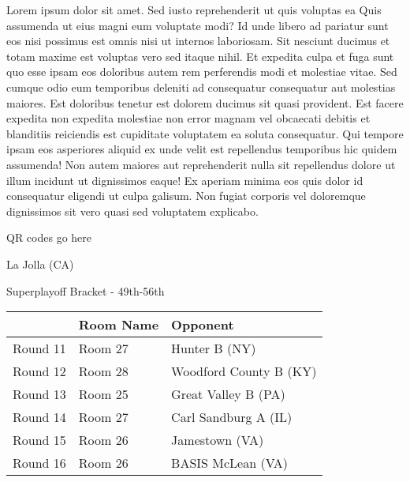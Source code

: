 \documentclass{article}%
\begin{document}
\vspace*{8pt}%
\linebreak%
\newline%
\newline%
    Lorem ipsum dolor sit amet. Sed iusto reprehenderit ut quis voluptas ea Quis assumenda ut eius magni eum voluptate modi? Id unde libero ad pariatur sunt eos nisi possimus est omnis nisi ut internos laboriosam. Sit nesciunt ducimus et totam maxime est voluptas vero sed itaque nihil. Et expedita culpa et fuga sunt quo esse ipsam eos doloribus autem rem perferendis modi et molestiae vitae.\newline%
\newline%
    Sed cumque odio eum temporibus deleniti ad consequatur consequatur aut molestias maiores. Est doloribus tenetur est dolorem ducimus sit quasi provident. Est facere expedita non expedita molestiae non error magnam vel obcaecati debitis et blanditiis reiciendis est cupiditate voluptatem ea soluta consequatur. Qui tempore ipsam eos asperiores aliquid ex unde velit est repellendus temporibus hic quidem assumenda!\newline%
\newline%
    Non autem maiores aut reprehenderit nulla sit repellendus dolore ut illum incidunt ut dignissimos eaque! Ex aperiam minima eos quis dolor id consequatur eligendi ut culpa galisum. Non fugiat corporis vel doloremque dignissimos sit vero quasi sed voluptatem explicabo.\newline%
\newline%
\vspace*{30pt}%
\begin{center}%
\begin{Huge}%
QR codes go here%
\end{Huge}%
\end{center}%
\newpage%
\begin{center}%
\begin{Huge}%
La Jolla (CA)%
\end{Huge}%
\vspace*{8pt}%
\linebreak%
\begin{Large}%
Superplayoff Bracket {-} 49th{-}56th%
\end{Large}%
\end{center}%
%
\begin{tabularx}{\textwidth}{|c|Y|Y|}%
\hline%
&Room Name&Opponent\\%
\hline%
Round 11&Room 27&Hunter B (NY)\\%
Round 12&Room 28&Woodford County B (KY)\\%
Round 13&Room 25&Great Valley B (PA)\\%
Round 14&Room 27&Carl Sandburg A (IL)\\%
Round 15&Room 26&Jamestown (VA)\\%
Round 16&Room 26&BASIS McLean (VA)\\%
\hline%
\end{tabularx}%
\end{document}
